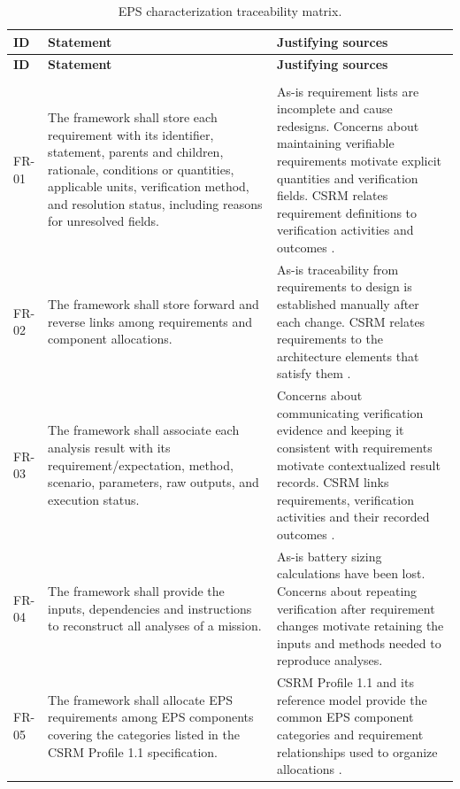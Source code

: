 \begin{longtable}{@{}P{0.13\ReportTableBodyWidth}P{0.45\ReportTableBodyWidth}P{0.42\ReportTableBodyWidth}@{}}
\caption{EPS characterization traceability matrix.}\label{tab:eps-characterization-traceability}\\
\toprule
\textbf{ID} & \textbf{Statement} & \textbf{Justifying sources} \\
\midrule
\endfirsthead
\toprule
\textbf{ID} & \textbf{Statement} & \textbf{Justifying sources} \\
\midrule
\endhead
\bottomrule
\endfoot
{} \\*
\midrule
FR-01 & The framework shall store each requirement with its identifier, statement, parents and children, rationale, conditions or quantities, applicable units, verification method, and resolution status, including reasons for unresolved fields. & As-is requirement lists are incomplete and cause redesigns. Concerns about maintaining verifiable requirements motivate explicit quantities and verification fields. CSRM relates requirement definitions to verification activities and outcomes \citep[Secs.~6.3--6.4]{omg2025csrm}. \\
\addlinespace[3pt]
FR-02 & The framework shall store forward and reverse links among requirements and component allocations. & As-is traceability from requirements to design is established manually after each change. CSRM relates requirements to the architecture elements that satisfy them \citep[Secs.~6.3--6.4]{omg2025csrm}. \\
\addlinespace[3pt]
FR-03 & The framework shall associate each analysis result with its requirement/expectation, method, scenario, parameters, raw outputs, and execution status. & Concerns about communicating verification evidence and keeping it consistent with requirements motivate contextualized result records. CSRM links requirements, verification activities and their recorded outcomes \citep[Secs.~6.3--6.4]{omg2025csrm}. \\
\addlinespace[3pt]
FR-04 & The framework shall provide the inputs, dependencies and instructions to reconstruct all analyses of a mission. & As-is battery sizing calculations have been lost. Concerns about repeating verification after requirement changes motivate retaining the inputs and methods needed to reproduce analyses. \\
\addlinespace[3pt]
FR-05 & The framework shall allocate EPS requirements among EPS components covering the categories listed in the CSRM Profile 1.1 specification. & CSRM Profile 1.1 and its reference model provide the common EPS component categories and requirement relationships used to organize allocations \citep{omg2025csrm,incose2025csrmmodel}. \\

\end{longtable}
